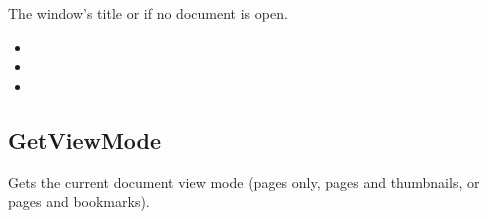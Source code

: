 \documentclass[letterpaper,12pt,english,openany,oneside]{sphinxmanual}
\begin{document}
The window’s title or  if no document is open.

\label{\detokenize{IAC_API_OLE_Objects:related-methods-33}}
\begin{itemize}
\item {} 
 

\item {} 
 

\item {} 
 

\end{itemize}




\subsection{GetViewMode}
\label{\detokenize{IAC_API_OLE_Objects:getviewmode}}
Gets the current document view mode (pages only, pages and thumbnails, or pages and bookmarks).


\begin{sphinxVerbatim}[commandchars=\\\{\}]
 
\end{sphinxVerbatim}

\end{document}
